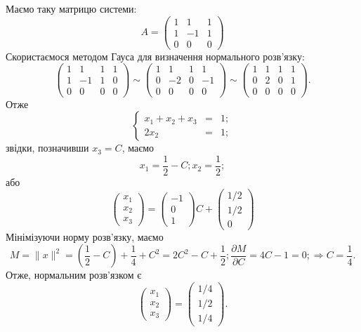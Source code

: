 \documentclass[14pt,twoside]{extreport}
\theoremstyle{mystyle}
\numberwithin{equation}{chapter}
\begin{document}
\begin{small}
Маємо таку матрицю системи:
\[
 A =
\begin{pmatrix}
 1 &  1 & 1\\
 1 & -1 & 1\\
 0 &  0 & 0
\end{pmatrix}
\]
Скористаємося методом Гауса для визначення нормального розв'язку:
\[
\left(
 \begin{array}{ccc|c}
 1 &  1 & 1 & 1\\
 1 & -1 & 1 & 0\\
 0 &  0 & 0 & 0
 \end{array}
\right)
\sim
\left(
 \begin{array}{ccc|c}
 1 &  1 & 1 &  1\\
 0 & -2 & 0 & -1\\
 0 &  0 & 0 &  0
 \end{array}
\right)
\sim
\left(
 \begin{array}{ccc|c}
 1 & 1 & 1 & 1\\
 0 & 2 & 0 & 1\\
 0 & 0 & 0 & 0
 \end{array}
\right).
\]
Отже
\[
\left\{
\begin{array}{lll}
 x_1 + x_2 + x_3 &=& 1;\\
 2 x_2 &=& 1;
\end{array}
\right.
\]
звідки, позначивши $x_3 = C$, маємо
\[
 x_1 = \dfrac{1}{2} - C; x_2 = \dfrac{1}{2};
\]
або
\[
 \begin{pmatrix}
  x_1\\
  x_2\\
  x_3
 \end{pmatrix}
=
 \begin{pmatrix}
  -1\\
  0\\
  1
 \end{pmatrix}
C+
 \begin{pmatrix}
  1/2\\
  1/2\\
  0
 \end{pmatrix}
\]
Мінімізуючи норму розв'язку, маємо
\[
 M=\|x\|^2 = \left(\dfrac{1}{2} - C\right) + \dfrac{1}{4} + C^2 = 2C^2 - C + \dfrac{1}{2}; \dfrac{\partial M}{\partial C} = 4C - 1=0; \Rightarrow C=\dfrac{1}{4}.
\]
Отже, нормальним розв'язком є
\[
 \begin{pmatrix}
  x_1\\
  x_2\\
  x_3
 \end{pmatrix}
=
 \begin{pmatrix}
  1/4\\
  1/2\\
  1/4
 \end{pmatrix}.
\]


\end{small}
\end{document}
